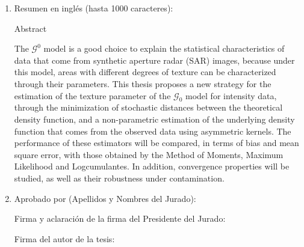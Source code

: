 \begin{enumerate}
	\item Resumen en inglés (hasta 1000 caracteres):
	
	Abstract
	
	The $\mathcal{G}^0$ model is a good choice to explain the statistical characteristics of data that come from synthetic aperture radar (SAR) images, because under this model, areas with different degrees of texture can be characterized through their parameters. This thesis proposes a new strategy for the estimation of the texture parameter of the $\mathcal G_0 $ model for intensity data, through the minimization of stochastic distances between the theoretical density function, and a non-parametric estimation of the underlying density function that comes from the observed data using asymmetric kernels. The performance of these estimators will be compared, in terms of bias and mean square error, with those obtained by the Method of Moments, Maximum Likelihood and Logcumulantes. In addition, convergence properties will be studied, as well as their robustness under contamination.
	
	\item Aprobado por (Apellidos y Nombres del Jurado):
	
	\bigskip\bigskip\bigskip\bigskip
	
	Firma y aclaración de la firma del Presidente del Jurado:				
	
	\bigskip\bigskip\bigskip\bigskip
	
	Firma del autor de la tesis:
	
\end{enumerate}

\newpage

